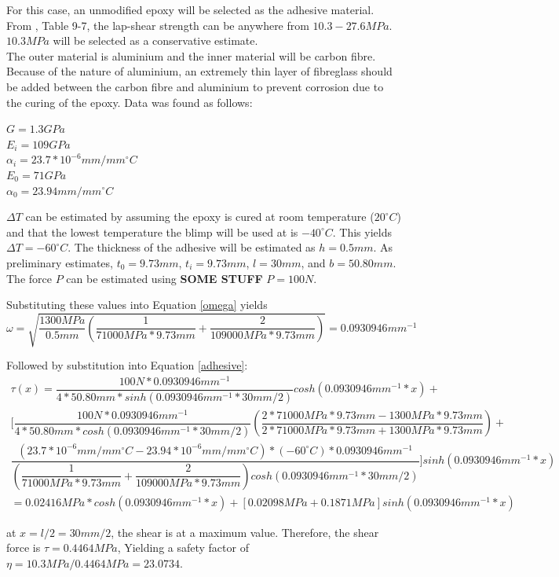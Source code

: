\documentclass[../main.tex]{subfiles}
\begin{document}
For this case, an unmodified epoxy will be selected as the adhesive material. From \cite{shigley}, Table 9-7, the lap-shear strength can be anywhere from $10.3-27.6MPa$. $10.3 MPa$ will be selected as a conservative estimate.\\

The outer material is aluminium and the inner material will be carbon fibre. Because of the nature of aluminium, an extremely thin layer of fibreglass should be added between the carbon fibre and aluminium to prevent corrosion due to the curing of the epoxy. Data was found as follows:

\begin{center}
$G=1.3 GPa$ \cite{epoxyShear}\\
$E_i=109GPa$ \cite{carbonFibre}\\
$\alpha _i=23.7*10^{-6}mm/mm^{\circ}C$ \cite{carbonFibre}\\
$E_0=71GPa$ \cite{shigley}\\
$\alpha _0=23.94 mm/mm^{\circ}C$ \cite{shigley}\\
\end{center}

$\Delta T$ can be estimated by assuming the epoxy is cured at room temperature ($20 ^{\circ}C$) and that the lowest temperature the blimp will be used at is  $-40 ^{\circ}C$. This yields $\Delta T = -60^{\circ}C$. The thickness of the adhesive will be estimated as $h=0.5mm$. As preliminary estimates, $t_0= 9.73mm$, $t_i= 9.73mm$, $l=30mm$, and $b=50.80mm$. The force $P$ can be estimated using \textbf{SOME STUFF} $P=100N$.

Substituting these values into Equation \ref{omega} yields
\begin{equation} \label{omegaSolve}
\omega = \sqrt{\dfrac{1300 MPa}{0.5mm}\left(\dfrac{1}{71000MPa*9.73mm}+\dfrac{2}{109000 MPa*9.73mm}\right)} = 0.0930946mm^{-1}
\end{equation}

Followed by substitution into Equation \ref{adhesive}:
\begin{multline} \label{adhesiveSolve}
\tau (x) = \dfrac{100N*0.0930946mm^{-1}}{4*50.80mm*sinh(0.0930946mm^{-1}* 30mm/2)}cosh(0.0930946mm^{-1}* x) + \\ \Bigg[\dfrac{100N*0.0930946mm^{-1}}{4*50.80mm*cosh(0.0930946mm^{-1}* 30mm/2)}\left(\dfrac{2*71000 MPa*9.73mm-1300MPa*9.73mm}{2*71000 MPa*9.73mm+1300MPa*9.73mm}\right)+ \\ \dfrac{(23.7*10^{-6}mm/mm^{\circ}C-23.94*10^{-6} mm/mm^{\circ}C)*(-60^{\circ}C)*0.0930946mm^{-1}}{\left(\dfrac{1}{71000MPa*9.73mm}+\dfrac{2}{109000 MPa*9.73mm}\right)cosh(0.0930946mm^{-1}* 30mm/2)}\Bigg] sinh(0.0930946mm^{-1}* x) \\ = 0.02416MPa*cosh(0.0930946mm^{-1}* x) + [0.02098MPa + 0.1871 MPa]sinh(0.0930946mm^{-1}* x)
\end{multline}

at $x = l/2 = 30mm/2$, the shear is at a maximum value. Therefore, the shear force is $\tau = 0.4464 MPa$, Yielding a safety factor of $\eta = 10.3MPa/0.4464MPa = 23.0734$.
\end{document}
